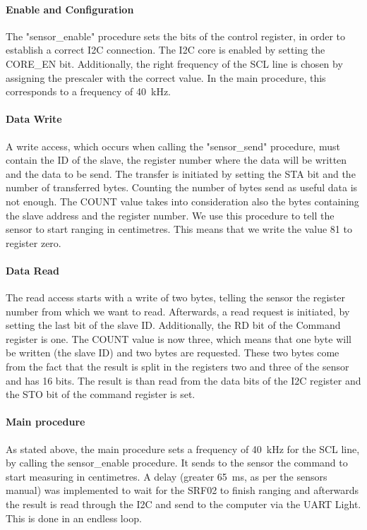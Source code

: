 			\paragraph{Enable and Configuration} %
	   		\label{par:enable_task1}
   				The "sensor\_enable" procedure sets the bits of the control register, in order to establish a correct I2C connection. The I2C core is enabled by setting the CORE\_EN bit. Additionally, the right frequency of the SCL line is chosen by assigning the prescaler with the correct value. In the main procedure, this corresponds to a frequency of \SI{40}{\kilo\hertz}.
				
			\paragraph{Data Write} %
	   		\label{par:data_write_task1}
	   			A write access, which occurs when calling the "sensor\_send" procedure, must contain the ID of the slave, the register number where the data will be written and the data to be send. The transfer is initiated by setting the STA bit and the number of transferred bytes. Counting the number of bytes send as useful data is not enough. The COUNT value takes into consideration also the bytes containing the slave address and the register number.
				We use this procedure to tell the sensor to start ranging in centimetres. This means that we write the value \num{81} to register zero.
			
			\paragraph{Data Read} %
	   		\label{par:data_read_task1}
	   			The read access starts with a write of two bytes, telling the sensor the register number from which we want to read. Afterwards, a read request is initiated, by setting the last bit of the slave ID. Additionally, the RD bit of the Command register is one. The COUNT value is now three, which means that one byte will be written (the slave ID) and two bytes are requested. These two bytes come from the fact that the result is split in the registers two and three of the sensor and has \num{16} bits. The result is than read from the data bits of the I2C register and the STO bit of the command register is set.
			
			\paragraph{Main procedure} %
	   		\label{par:data_read_task1}
	   			As stated above, the main procedure sets a frequency of \SI{40}{\kilo\hertz} for the SCL line, by calling the sensor\_enable procedure. It sends to the sensor the command to start measuring in centimetres. A delay (greater \SI{65}{\milli\second}, as per the sensors manual) was implemented to wait for the SRF02 to finish ranging and afterwards the result is read through the I2C and send to the computer via the UART Light. This is done in an endless loop.

